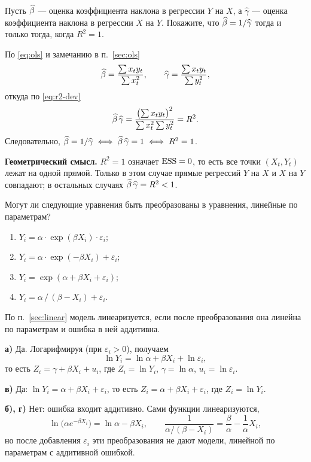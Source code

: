 
Пусть $\widehat{\beta}$ — оценка коэффициента наклона в регрессии $Y$ на $X$,
а $\widehat{\gamma}$ — оценка коэффициента наклона в регрессии $X$ на $Y$.
Покажите, что $\widehat{\beta} = 1/\widehat{\gamma}$ тогда и только тогда, когда $R^2 = 1$.

\begin{solution}
По \eqref{eq:ols} и замечанию в п.~\ref{sec:ols}
\[
  \widehat{\beta} = \frac{\sum x_ty_t}{\sum x_t^2},
  \qquad
  \widehat{\gamma} = \frac{\sum x_ty_t}{\sum y_t^2},
\]
откуда по \eqref{eq:r2-dev}
\[
  \widehat{\beta}\,\widehat{\gamma} = \frac{\bigl(\sum x_ty_t\bigr)^2}{\sum x_t^2\sum y_t^2} = R^2 .
\]
Следовательно,
$\widehat{\beta} = 1/\widehat{\gamma} \iff \widehat{\beta}\,\widehat{\gamma} = 1 \iff R^2 = 1$.

\medskip
\textbf{Геометрический смысл.} $R^2 = 1$ означает $\mathrm{ESS} = 0$, то есть все точки
$(X_t, Y_t)$ лежат на одной прямой. Только в этом случае прямые регрессий $Y$ на
$X$ и $X$ на $Y$ совпадают; в остальных случаях $\widehat{\beta}\,\widehat{\gamma} = R^2 < 1$.
\end{solution}


Могут ли следующие уравнения быть преобразованы в уравнения, линейные
по параметрам?
\begin{enumerate}[label=\asbuk*), leftmargin=2.2em, itemsep=3pt]
  \item $Y_i = \alpha \cdot \exp(\beta X_i)\cdot \varepsilon_i$;
  \item $Y_i = \alpha \cdot \exp(-\beta X_i) + \varepsilon_i$;
  \item $Y_i = \exp(\alpha + \beta X_i + \varepsilon_i)$;
  \item $Y_i = \alpha \,/\, (\beta - X_i) + \varepsilon_i$.
\end{enumerate}

\begin{solution}
По п.~\ref{sec:linear} модель линеаризуется, если после преобразования она
линейна по параметрам и ошибка в ней аддитивна.

\medskip
\textbf{а)} Да. Логарифмируя (при $\varepsilon_i > 0$), получаем
\[
  \ln Y_i = \ln\alpha + \beta X_i + \ln\varepsilon_i ,
\]
то есть $Z_i = \gamma + \beta X_i + u_i$, где $Z_i = \ln Y_i$,
$\gamma = \ln\alpha$, $u_i = \ln\varepsilon_i$.

\medskip
\textbf{в)} Да: $\ln Y_i = \alpha + \beta X_i + \varepsilon_i$, то есть
$Z_i = \alpha + \beta X_i + \varepsilon_i$, где $Z_i = \ln Y_i$.

\medskip
\textbf{б), г)} Нет: ошибка входит аддитивно. Сами функции линеаризуются,
\[
  \ln\bigl(\alpha e^{-\beta X_i}\bigr) = \ln\alpha - \beta X_i,
  \qquad
  \frac{1}{\alpha/(\beta - X_i)} = \frac{\beta}{\alpha} - \frac{1}{\alpha}X_i,
\]
но после добавления $\varepsilon_i$ эти преобразования не дают модели, линейной
по параметрам с аддитивной ошибкой.
\end{solution}


